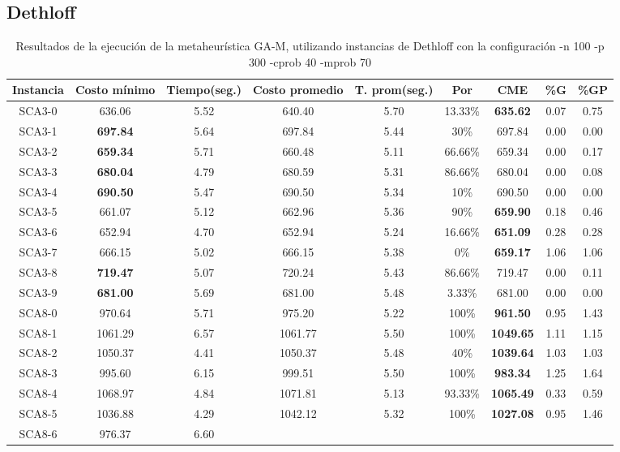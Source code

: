\subsection{Dethloff}\label{tablas-entonacion-GA-M-dethloff}


\begin{table}[ht]
\caption{Resultados de la ejecución de la metaheurística GA-M, utilizando instancias de Dethloff con la configuración -n 100 -p 300 -cprob 40 -mprob 70}
\centering
\small
\begin{tabular}{c c c c c c c c c}
\hline\hline
Instancia & Costo mínimo & Tiempo(seg.) & Costo promedio & T. prom(seg.) & Por & CME & \%G & \%GP \\ [0.5ex]
\hline
SCA3-0 & 636.06 & 5.52 & 
640.40 & 5.70 & 13.33\% & \bf{635.62} & 
0.07 & 0.75\\SCA3-1 & \bf{697.84} & 5.64 & 
697.84 & 5.44 & 30\% & 697.84 & 0.00
 & 0.00\\
SCA3-2 & \bf{659.34} & 5.71 & 
660.48 & 5.11 & 66.66\% & 659.34 & 0.00
 & 0.17\\SCA3-3 & \bf{680.04} & 4.79 & 
680.59 & 5.31 & 86.66\% & 680.04 & 0.00
 & 0.08\\SCA3-4 & \bf{690.50} & 5.47 & 
690.50 & 5.34 & 10\% & 690.50 & 0.00
 & 0.00\\
SCA3-5 & 661.07 & 5.12 & 
662.96 & 5.36 & 90\% & \bf{659.90} & 
0.18 & 0.46\\SCA3-6 & 652.94 & 4.70 & 
652.94 & 5.24 & 16.66\% & \bf{651.09} & 
0.28 & 0.28\\SCA3-7 & 666.15 & 5.02 & 
666.15 & 5.38 & 0\% & \bf{659.17} & 
1.06 & 1.06\\SCA3-8 & \bf{719.47} & 5.07 & 
720.24 & 5.43 & 86.66\% & 719.47 & 0.00
 & 0.11\\SCA3-9 & \bf{681.00} & 5.69 & 
681.00 & 5.48 & 3.33\% & 681.00 & 0.00
 & 0.00\\
SCA8-0 & 970.64 & 5.71 & 
975.20 & 5.22 & 100\% & \bf{961.50} & 
0.95 & 1.43\\SCA8-1 & 1061.29 & 6.57 & 
1061.77 & 5.50 & 100\% & \bf{1049.65} & 
1.11 & 1.15\\SCA8-2 & 1050.37 & 4.41 & 
1050.37 & 5.48 & 40\% & \bf{1039.64} & 
1.03 & 1.03\\SCA8-3 & 995.60 & 6.15 & 
999.51 & 5.50 & 100\% & \bf{983.34} & 
1.25 & 1.64\\SCA8-4 & 1068.97 & 4.84 & 
1071.81 & 5.13 & 93.33\% & \bf{1065.49} & 
0.33 & 0.59\\SCA8-5 & 1036.88 & 4.29 & 
1042.12 & 5.32 & 100\% & \bf{1027.08} & 
0.95 & 1.46\\SCA8-6 & 976.37 & 6.60 & 

\end{tabular}
\end{table}
